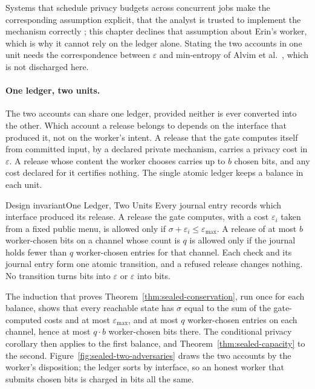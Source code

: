 \documentclass[11pt,a4paper]{article}
\theoremstyle{definition}
\begin{document}


Systems that schedule privacy budgets across concurrent jobs make the
corresponding assumption explicit, that the analyst is trusted to implement
the mechanism correctly ; this chapter declines that assumption
about Erin's worker, which is why it cannot rely on the ledger
alone. Stating the two accounts in one unit needs the correspondence between
$\varepsilon$ and min-entropy of Alvim et al.\ , which is not
discharged here.

\paragraph{One ledger, two units.}
The two accounts can share one ledger, provided neither is ever converted
into the other. Which account a release belongs to depends on the interface
that produced it, not on the worker's intent. A release that the gate
computes itself from committed input, by a declared private mechanism,
carries a privacy cost in $\varepsilon$. A release whose content the worker
chooses carries up to $b$ chosen bits, and any cost declared for it
certifies nothing. The single atomic ledger keeps a balance in each unit.

\begin{pdclaim}{Design invariant}{One Ledger, Two Units}
\setlength{\parskip}{4pt plus 1pt}
\label{inv:sealed-two-units}
Every journal entry records which interface produced its release. A release
the gate computes, with a cost $\varepsilon_i$ taken from a fixed public
menu, is allowed only if $\sigma+\varepsilon_i\le\varepsilon_{\max}$. A
release of at most $b$ worker-chosen bits on a channel whose count is $q$ is
allowed only if the journal holds fewer than $q$ worker-chosen entries for
that channel. Each check and its journal entry form one atomic transition,
and a refused release changes nothing. No transition turns bits into
$\varepsilon$ or $\varepsilon$ into bits.
\end{pdclaim}

The induction that proves Theorem~\ref{thm:sealed-conservation}, run once
for each balance, shows that every reachable state has $\sigma$ equal to the
sum of the gate-computed costs and at most $\varepsilon_{\max}$, and at most
$q$ worker-chosen entries on each channel, hence at most $q\cdot b$
worker-chosen bits there. The conditional privacy corollary then applies to
the first balance, and Theorem~\ref{thm:sealed-capacity} to the second.
Figure~\ref{fig:sealed-two-adversaries} draws the two accounts by the
worker's disposition; the ledger sorts by interface, so an honest worker that
submits chosen bits is charged in bits all the same.
\end{document}
